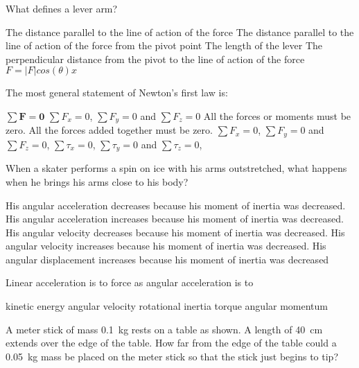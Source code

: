 \documentclass{../../../oss-ap12ibhl}
\begin{document}
\genheader


\begin{questions}

  \question What defines a lever arm?
  \begin{choices}
    \choice The distance parallel to the line of action of the force
    \choice The distance parallel to the line of action of the force from the
    pivot point
    \choice The length of the lever
    \choice The perpendicular distance from the pivot to the line of action of
    the force
    \choice $F = |F|cos(\theta)x$
  \end{choices}
    
  \question The most general statement of Newton's first law is:
  \begin{choices}
    \choice $\sum\bm{F}=\bm{0}$
    \choice $\sum F_x=0$, $\sum F_y=0$ and $\sum F_z=0$
    \choice All the forces or moments must be zero.
    \choice All the forces added together must be zero.
    \choice $\sum F_x=0$, $\sum F_y=0$ and $\sum F_z=0$, $\sum\tau_x=0$,
    $\sum\tau_y=0$ and $\sum\tau_z=0$,
  \end{choices}

  \question When a skater performs a spin on ice with his arms outstretched,
  what happens when he brings his arms close to his body?
  \begin{choices}
    \choice His angular acceleration decreases because his moment of inertia
    was decreased.
    \choice His angular acceleration increases because his moment of inertia
    was decreased.
    \choice His angular velocity decreases because his moment of inertia was
    decreased.
    \choice His angular velocity increases because his moment of inertia was
    decreased.
    \choice His angular displacement increases because his moment of inertia
    was decreased
  \end{choices}
  \vspace{.7in}
    
  \question Linear acceleration is to force as angular acceleration is to
  \begin{choices}
    \choice kinetic energy
    \choice angular velocity
    \choice rotational inertia
    \choice torque
    \choice angular momentum
  \end{choices}

  \question A meter stick of mass \SI{.1}{\kilo\gram} rests on a table as
  shown. A length of \SI{40}{\centi\metre} extends over the edge of the table.
  How far from the edge of the table could a \SI{.05}{\kilo\gram} mass be
  placed on the meter stick so that the stick just begins to tip?


\end{questions}
\end{document}

